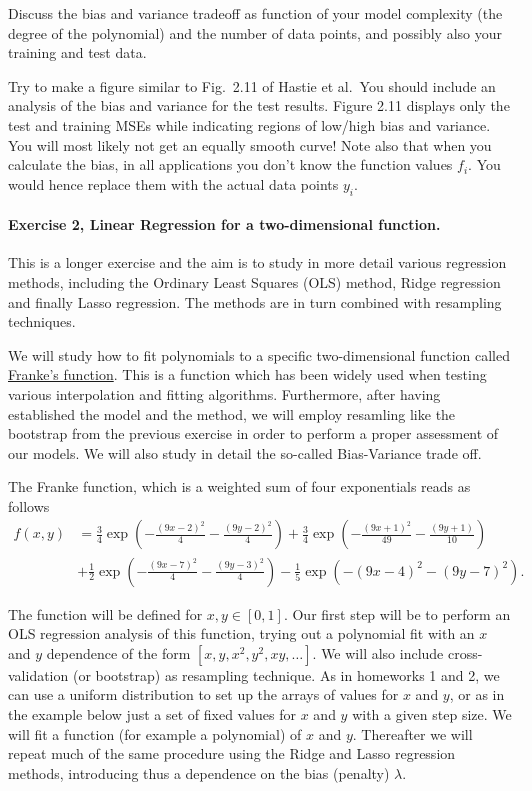 \documentclass[%
oneside,                 %
final,                   %
10pt]{article}
\begin{document}
Discuss the bias and variance tradeoff as function
of your model complexity (the degree of the polynomial) and the number
of data points, and possibly also your training and test data.

Try to make a figure similar to Fig.~2.11 of Hastie et al.~You should include an analysis of the bias and variance for the test results. Figure 2.11 displays only the test and training MSEs while indicating regions of low/high bias and variance. You will most likely not get an
equally smooth curve! Note also that when you calculate the bias, in all applications you don't know the function values $f_i$. You would hence replace them with the actual data points $y_i$.



\paragraph{Exercise 2, Linear Regression for  a two-dimensional function.}
This is a longer  exercise and the aim is to study in more detail various
regression methods, including the Ordinary Least Squares (OLS) method,
Ridge regression and finally Lasso regression.
The methods are in turn combined with resampling techniques.

We will study how to fit polynomials to a specific
two-dimensional function called \href{{http://www.dtic.mil/dtic/tr/fulltext/u2/a081688.pdf}}{Franke's
function}.  This
is a function which has been widely used when testing various
interpolation and fitting algorithms. Furthermore, after having
established the model and the method, we will employ resamling
like the bootstrap from the previous exercise in order to perform a
proper assessment of our models. We will also study in detail the
so-called Bias-Variance trade off.


The Franke function, which is a weighted sum of four exponentials  reads as follows
\begin{align*}
f(x,y) &= \frac{3}{4}\exp{\left(-\frac{(9x-2)^2}{4} - \frac{(9y-2)^2}{4}\right)}+\frac{3}{4}\exp{\left(-\frac{(9x+1)^2}{49}- \frac{(9y+1)}{10}\right)} \\
&+\frac{1}{2}\exp{\left(-\frac{(9x-7)^2}{4} - \frac{(9y-3)^2}{4}\right)} -\frac{1}{5}\exp{\left(-(9x-4)^2 - (9y-7)^2\right) }.
\end{align*}

The function will be defined for $x,y\in [0,1]$.  Our first step will
be to perform an OLS regression analysis of this function, trying out
a polynomial fit with an $x$ and $y$ dependence of the form $[x, y,
x^2, y^2, xy, \dots]$. We will also include cross-validation (or bootstrap) as
resampling technique.  As in homeworks 1 and 2, we can use a uniform
distribution to set up the arrays of values for $x$ and $y$, or as in
the example below just a set of fixed 
values for $x$ and $y$ with a given step
size.  We will fit a
function (for example a polynomial) of $x$ and $y$.  Thereafter we
will repeat much of the same procedure using the Ridge and Lasso
regression methods, introducing thus a dependence on the bias
(penalty) $\lambda$.
\end{document}

